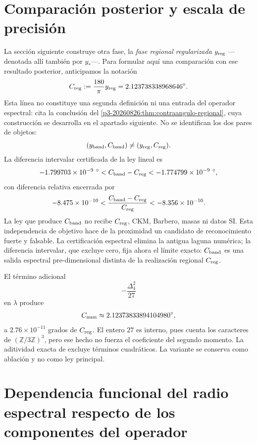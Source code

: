 \section{Comparación posterior y escala de precisión}

La sección siguiente construye otra fase, la \emph{fase regional
regularizada} \(y_{\rm reg}\) ---denotada allí también por \(y_*\)---. Para
formular aquí una comparación con ese resultado posterior, anticipamos la
notación
\[
 C_{\rm reg}:=\frac{180}{\pi}y_{\rm reg}
 =2.123738338968646^\circ.
\]
Esta línea no constituye una segunda definición ni una entrada del operador
espectral: cita la conclusión del
\cref{p3-20260826:thm:contraangulo-regional}, cuya construcción se desarrolla en el
apartado siguiente.
No se identifican los dos pares de objetos:
\[
 (y_{\rm band},C_{\rm band})
 \ne
 (y_{\rm reg},C_{\rm reg}).
\]
La diferencia intervalar certificada de la ley lineal es
\[
 -1.799703\times10^{-9}\ {}^\circ
 <C_{\rm band}-C_{\rm reg}
 <-1.774799\times10^{-9}\ {}^\circ,
\]
con diferencia relativa encerrada por
\[
 -8.475\times10^{-10}
 <\frac{C_{\rm band}-C_{\rm reg}}{C_{\rm reg}}
 <-8.356\times10^{-10}.
\]
La ley que produce \(C_{\rm band}\) no recibe \(C_{\rm reg}\), CKM, Barbero,
masas ni datos SI\@. Esta independencia de objetivo hace de la proximidad un
candidato de reconocimiento fuerte y falsable. La certificación espectral
elimina la antigua laguna numérica; la diferencia intervalar, que excluye
cero, fija ahora el límite exacto: \(C_{\rm band}\) es una salida espectral
pre-dimensional distinta de la realización regional
\(C_{\rm reg}\).

El término adicional
\[
 -\frac{\Delta_4^2}{27}
\]
en \(\lambda\) produce
\[
 C_{\rm num}\approx2.12373833894104980{}^\circ,
\]
a \(2.76\times10^{-11}\) grados de \(C_{\rm reg}\). El entero \(27\) es interno,
pues cuenta los caracteres de \((\mathbb Z/3\mathbb Z)^3\), pero ese
hecho no fuerza el coeficiente del segundo momento. La aditividad exacta de
\HAdd excluye términos cuadráticos. La variante se conserva como ablación y no
como ley principal.

\section{Dependencia funcional del radio espectral respecto de los componentes del operador}

